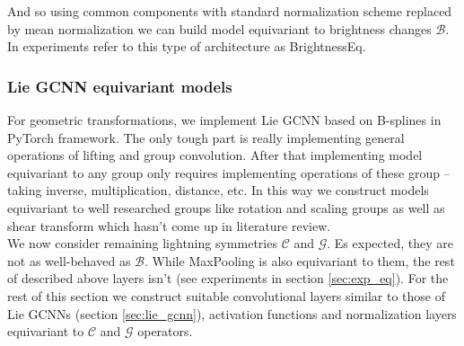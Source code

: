 And so using common components with standard normalization scheme replaced by
mean normalization we can build model equivariant to brightness changes
$\mathcal{B}$. In
experiments refer to this type of architecture as BrightnessEq.

\subsubsection{Lie GCNN equivariant models}
For geometric transformations, we implement Lie GCNN
based on B-splines \cite{bekkers2019} in PyTorch framework.
The only tough part is really
implementing general operations of lifting and group convolution.
After that implementing model equivariant to any group only requires implementing operations
of these group -- taking inverse, multiplication, distance, etc.
In this way we construct models equivariant to well researched groups like
rotation and
scaling groups as well as shear transform which hasn't come up in literature
review.
\\

We now consider remaining lightning symmetries $\mathcal{C}$ and $\mathcal{G}$.
Es expected, they are not
as well-behaved as $\mathcal{B}$. While MaxPooling is also equivariant to them,
the rest
of described above layers isn't (see experiments in section \ref{sec:exp_eq}).
For the rest of this section we construct suitable
convolutional layers similar to those of Lie
GCNNs (section \ref{sec:lie_gcnn}),
activation functions and
normalization layers
equivariant to $\mathcal{C}$ and $\mathcal{G}$ operators.

